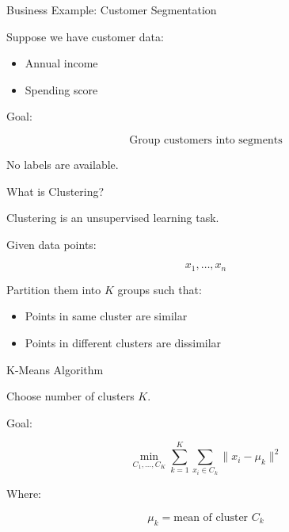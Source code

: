 \documentclass{beamer}
\begin{document}
\begin{frame}{Business Example: Customer Segmentation}

Suppose we have customer data:

\begin{itemize}
    \item Annual income
    \item Spending score
\end{itemize}

\vspace{0.5cm}

Goal:

\[
\text{Group customers into segments}
\]

\vspace{0.5cm}

No labels are available.

\end{frame}

\begin{frame}{What is Clustering?}

Clustering is an unsupervised learning task.

\vspace{0.5cm}

Given data points:

\[
x_1, \dots, x_n
\]

Partition them into $K$ groups such that:

\begin{itemize}
    \item Points in same cluster are similar
    \item Points in different clusters are dissimilar
\end{itemize}

\end{frame}

\begin{frame}{K-Means Algorithm}

Choose number of clusters $K$.

\vspace{0.5cm}

Goal:

\[
\min_{C_1,\dots,C_K}
\sum_{k=1}^K
\sum_{x_i \in C_k}
\|x_i - \mu_k\|^2
\]

\vspace{0.5cm}

Where:

\[
\mu_k = \text{mean of cluster } C_k
\]

\end{frame}
\end{document}
